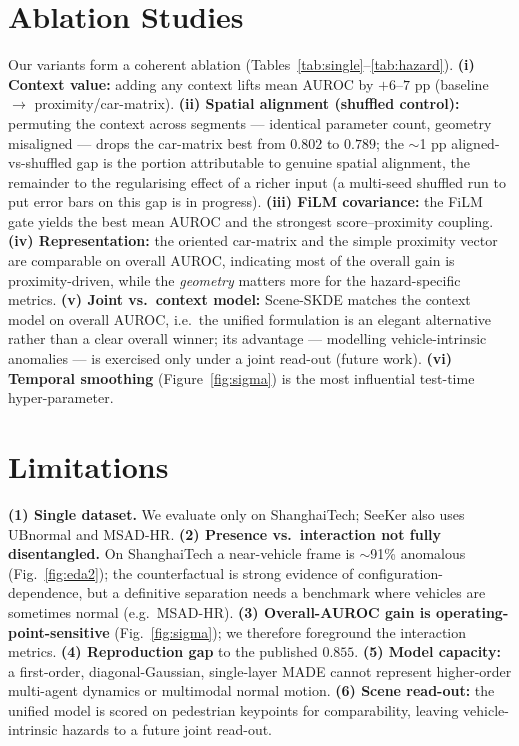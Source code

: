 \documentclass{article}
\begin{document}
\section{Ablation Studies}
\label{sec:ablation}
Our variants form a coherent ablation (Tables~\ref{tab:single}--\ref{tab:hazard}).
\textbf{(i) Context value:} adding any context lifts mean AUROC by $+6$--$7$ pp
(baseline $\to$ proximity/car-matrix). \textbf{(ii) Spatial alignment
(shuffled control):} permuting the context across segments --- identical
parameter count, geometry misaligned --- drops the car-matrix best from $0.802$ to
$0.789$; the $\sim$1 pp aligned-vs-shuffled gap is the portion attributable to
genuine spatial alignment, the remainder to the regularising effect of a richer
input (a multi-seed shuffled run to put error bars on this gap is in progress).
\textbf{(iii) FiLM covariance:} the FiLM gate yields the best mean AUROC and the
strongest score--proximity coupling. \textbf{(iv) Representation:} the oriented
car-matrix and the simple proximity vector are comparable on overall AUROC,
indicating most of the overall gain is proximity-driven, while the
\emph{geometry} matters more for the hazard-specific metrics. \textbf{(v) Joint
vs.\ context model:} Scene-SKDE matches the context model on overall AUROC, i.e.\
the unified formulation is an elegant alternative rather than a clear overall
winner; its advantage --- modelling vehicle-intrinsic anomalies --- is exercised
only under a joint read-out (future work). \textbf{(vi) Temporal smoothing}
(Figure~\ref{fig:sigma}) is the most influential test-time hyper-parameter.

\section{Limitations}
\label{sec:limitations}
\textbf{(1) Single dataset.} We evaluate only on ShanghaiTech; SeeKer also uses
UBnormal and MSAD-HR. \textbf{(2) Presence vs.\ interaction not fully
disentangled.} On ShanghaiTech a near-vehicle frame is $\sim$91\% anomalous
(Fig.~\ref{fig:eda2}); the counterfactual is strong evidence of
configuration-dependence, but a definitive separation needs a benchmark where
vehicles are sometimes normal (e.g.\ MSAD-HR). \textbf{(3) Overall-AUROC gain is
operating-point-sensitive} (Fig.~\ref{fig:sigma}); we therefore foreground the
interaction metrics. \textbf{(4) Reproduction gap} to the published $0.855$.
\textbf{(5) Model capacity:} a first-order, diagonal-Gaussian, single-layer MADE
cannot represent higher-order multi-agent dynamics or multimodal normal motion.
\textbf{(6) Scene read-out:} the unified model is scored on pedestrian keypoints
for comparability, leaving vehicle-intrinsic hazards to a future joint read-out.
\end{document}
